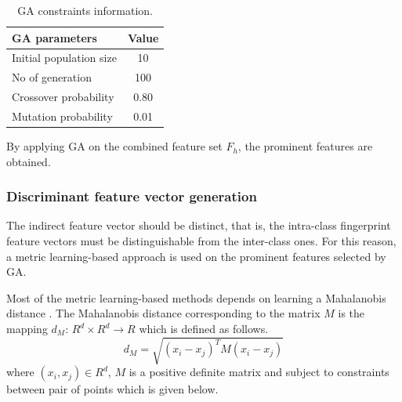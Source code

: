 \begin{table}[!ht]
	\caption{GA constraints information.}
	\label{table:GA}
	\begin{center}
		\begin{tabular}{|l|c|}
			\hline
			GA parameters           & Value \\ \hline
			Initial population size & 10    \\
			No of generation        & 100   \\ Crossover probability & 0.80 \\
			Mutation probability    & 0.01  \\ \hline
		\end{tabular}%
	\end{center}

\end{table}
By applying GA on the combined feature set $F_{h}$, the prominent features are obtained.


\subsubsection{Discriminant feature vector generation}
The indirect feature vector should be distinct, that is,
the intra-class fingerprint feature vectors must be distinguishable from
the inter-class ones. For this reason, a metric learning-based approach
\cite{suarez2020tutorial} is used on the prominent features selected by GA.

\par

Most of the metric learning-based methods depends on learning a Mahalanobis distance
\cite{suarez2020tutorial}. The Mahalanobis distance corresponding to the matrix
$M$ is the mapping $d_{M}$: $R^{d} \times R^{d} \rightarrow R$ which is defined
as follows.
\begin{equation}
	d_{M}=\sqrt{(x_{i}-x_{j})^{T}M(x_{i}-x_{j})}
\end{equation}
where $(x_{i},x_{j}) \in  R^{d}$, $M$ is a positive definite matrix and subject
to constraints between pair of points which is given below.

